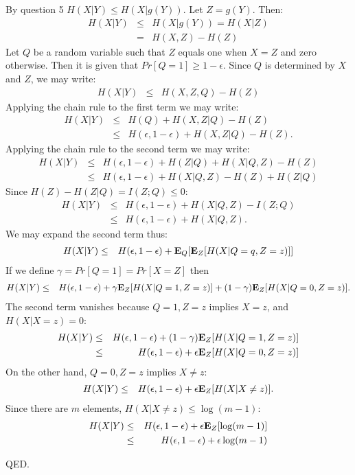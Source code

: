 \documentclass[11pt]{article} \usepackage{amssymb}
\newcommand{\E}{{\bf E}} \newcommand{\Cov}{{\bf Cov}}
\begin{document}
\section{}
By question 5 $H(X|Y)\leq H(X|g(Y))$. Let $Z=g(Y)$. Then:
\begin{eqnarray*}
  H(X|Y)
  &\leq& H(X|g(Y))=H(X|Z)\\
  &=& H(X,Z)-H(Z)
\end{eqnarray*}
Let $Q$ be a random variable such that $Z$ equals one when $X=Z$ and zero 
otherwise. Then it is given that $Pr[Q=1]\geq 1-\epsilon$. Since $Q$ is 
determined by $X$ and $Z$, we may write:
\begin{eqnarray*}
  H(X|Y) 
  &\leq& H(X,Z,Q) - H(Z)
\end{eqnarray*}
Applying the chain rule to the first term we may write:
\begin{eqnarray*}
  H(X|Y) 
  &\leq& H(Q) + H(X,Z|Q) - H(Z)\\  
  &\leq& H(\epsilon,1-\epsilon) + H(X,Z|Q) - H(Z).
\end{eqnarray*}
Applying the chain rule to the second term we may write:
\begin{eqnarray*}
  H(X|Y) 
  &\leq& H(\epsilon,1-\epsilon) + H(Z|Q) + H(X|Q,Z) - H(Z)\\
  &\leq& H(\epsilon,1-\epsilon) + H(X|Q,Z) - H(Z) + H(Z|Q)
\end{eqnarray*}
Since $H(Z) - H(Z|Q) = I(Z;Q) \leq 0$:
\begin{eqnarray*}
  H(X|Y) 
  &\leq& H(\epsilon,1-\epsilon) + H(X|Q,Z) - I(Z;Q)\\
  &\leq& H(\epsilon,1-\epsilon) + H(X|Q,Z).
\end{eqnarray*}
We may expand the second term thus:
\begin{eqnarray*}
  H(X|Y) 
  &\leq& H(\epsilon,1-\epsilon) + \E_Q[\E_Z[H(X|Q=q,Z=z)]]
\end{eqnarray*}
If we define $\gamma=Pr[Q=1]=Pr[X=Z]$ then
\begin{eqnarray*}
  H(X|Y) 
  &\leq& H(\epsilon,1-\epsilon) + \gamma\E_Z[H(X|Q=1,Z=z)] + (1-\gamma)\E_Z[H(X|Q=0,Z=z)].
\end{eqnarray*}
The second term vanishes because $Q=1,Z=z$ implies $X=z$, and $H(X|X=z)=0$:
\begin{eqnarray*}
  H(X|Y) 
  &\leq& H(\epsilon,1-\epsilon) + (1-\gamma)\E_Z[H(X|Q=1,Z=z)]\\
  &\leq& H(\epsilon,1-\epsilon) + \epsilon\E_Z[H(X|Q=0,Z=z)]
\end{eqnarray*}
On the other hand, $Q=0,Z=z$ implies $X\not=z$:
\begin{eqnarray*}
  H(X|Y) 
  &\leq& H(\epsilon,1-\epsilon) + \epsilon\E_Z[H(X|X\not=z)].
\end{eqnarray*}
Since there are $m$ elements, $H(X|X\not=z)\leq \log(m-1)$:
\begin{eqnarray*}
  H(X|Y) 
  &\leq& H(\epsilon,1-\epsilon) + \epsilon\E_Z[\log(m-1)]\\
  &\leq& H(\epsilon,1-\epsilon) + \epsilon\log(m-1)
\end{eqnarray*}

QED.
\end{document}
